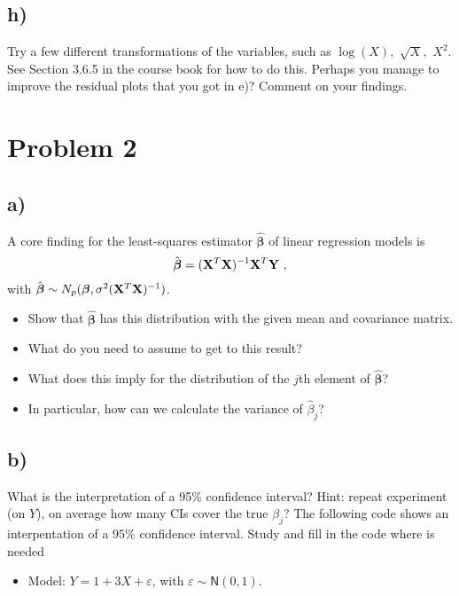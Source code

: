 \documentclass[
]{article}
\providecommand{\tightlist}{%
  \setlength{\itemsep}{0pt}\setlength{\parskip}{0pt}}
\begin{document}
\hypertarget{h}{%
\subsection{h)}\label{h}}

Try a few different transformations of the variables, such as
\(\log(X),\) \(\sqrt{X},\) \(X^2\). See Section 3.6.5 in the course book
for how to do this. Perhaps you manage to improve the residual plots
that you got in e)? Comment on your findings.

\hypertarget{problem-2}{%
\section{Problem 2}\label{problem-2}}

\hypertarget{a-1}{%
\subsection{a)}\label{a-1}}

A core finding for the least-squares estimator
\(\hat{\boldsymbol\beta}\) of linear regression models is
\[ \hat{\boldsymbol\beta}=({\bf X}^T{\bf X})^{-1} {\bf X}^T {\bf Y} \ , \]
with
\(\hat{\boldsymbol\beta}\sim N_{p}(\boldsymbol\beta,\sigma^2({\bf X}^T{\bf X})^{-1})\).

\begin{itemize}
\tightlist
\item
  Show that \(\hat{\boldsymbol\beta}\) has this distribution with the
  given mean and covariance matrix.
\item
  What do you need to assume to get to this result?
\item
  What does this imply for the distribution of the \(j\)th element of
  \(\hat{\boldsymbol\beta}\)?
\item
  In particular, how can we calculate the variance of \(\hat{\beta}_j\)?
\end{itemize}

\hypertarget{b-1}{%
\subsection{b)}\label{b-1}}

What is the interpretation of a 95\% confidence interval? Hint: repeat
experiment (on \(Y\)), on average how many CIs cover the true
\(\beta_j\)? The following code shows an interpentation of a \(95\%\)
confidence interval. Study and fill in the code where is needed

\begin{itemize}
\tightlist
\item
  Model: \(Y = 1 + 3X + \varepsilon\), with
  \(\varepsilon \sim \mathsf{N}(0,1)\).
\end{itemize}
\end{document}
